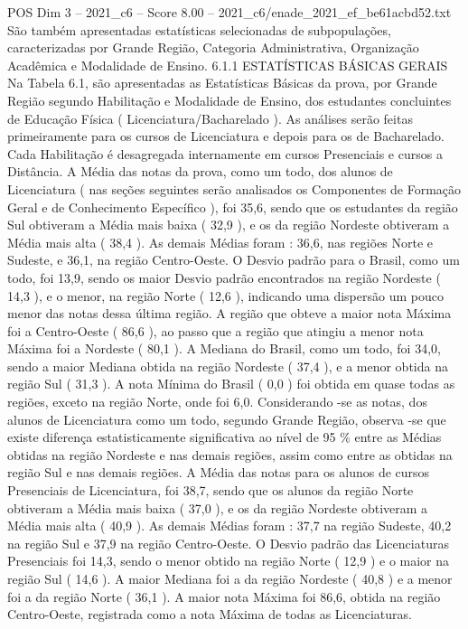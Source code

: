 \begin{textsample}{POS Dim 3 – 2021\_c6 – Score 8.00 – 2021\_c6/enade\_2021\_ef\_be61acbd52.txt}
São também apresentadas estatísticas selecionadas de subpopulações, caracterizadas por Grande Região, Categoria Administrativa, Organização Acadêmica e Modalidade de Ensino. 6.1.1 ESTATÍSTICAS BÁSICAS GERAIS Na Tabela 6.1, são apresentadas as Estatísticas Básicas da prova, por Grande Região segundo Habilitação e Modalidade de Ensino, dos estudantes concluintes de Educação Física ( Licenciatura/Bacharelado ).
As análises serão feitas primeiramente para os cursos de Licenciatura e depois para os de Bacharelado.
Cada Habilitação é desagregada internamente em cursos Presenciais e cursos a Distância.
A Média das notas da prova, como um todo, dos alunos de Licenciatura ( nas seções seguintes serão analisados os Componentes de Formação Geral e de Conhecimento Específico ), foi 35,6, sendo que os estudantes da região Sul obtiveram a Média mais baixa ( 32,9 ), e os da região Nordeste obtiveram a Média mais alta ( 38,4 ).
As demais Médias foram : 36,6, nas regiões Norte e Sudeste, e 36,1, na região Centro-Oeste.
O Desvio padrão para o Brasil, como um todo, foi 13,9, sendo os maior Desvio padrão encontrados na região Nordeste ( 14,3 ), e o menor, na região Norte ( 12,6 ), indicando uma dispersão um pouco menor das notas dessa última região.
A região que obteve a maior nota Máxima foi a Centro-Oeste ( 86,6 ), ao passo que a região que atingiu a menor nota Máxima foi a Nordeste ( 80,1 ).
A Mediana do Brasil, como um todo, foi 34,0, sendo a maior Mediana obtida na região Nordeste ( 37,4 ), e a menor obtida na região Sul ( 31,3 ).
A nota Mínima do Brasil ( 0,0 ) foi obtida em quase todas as regiões, exceto na região Norte, onde foi 6,0.
Considerando -se as notas, dos alunos de Licenciatura como um todo, segundo Grande Região, observa -se que existe diferença estatisticamente significativa ao nível de 95 \% entre as Médias obtidas na região Nordeste e nas demais regiões, assim como entre as obtidas na região Sul e nas demais regiões.
A Média das notas para os alunos de cursos Presenciais de Licenciatura, foi 38,7, sendo que os alunos da região Norte obtiveram a Média mais baixa ( 37,0 ), e os da região Nordeste obtiveram a Média mais alta ( 40,9 ).
As demais Médias foram : 37,7 na região Sudeste, 40,2 na região Sul e 37,9 na região Centro-Oeste.
O Desvio padrão das Licenciaturas Presenciais foi 14,3, sendo o menor obtido na região Norte ( 12,9 ) e o maior na região Sul ( 14,6 ).
A maior Mediana foi a da região Nordeste ( 40,8 ) e a menor foi a da região Norte ( 36,1 ).
A maior nota Máxima foi 86,6, obtida na região Centro-Oeste, registrada como a nota Máxima de todas as Licenciaturas.

\end{textsample}
